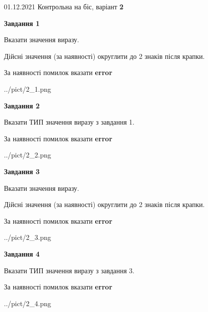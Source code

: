 \documentclass[11pt, ukrainian]{article}
\begin{document}
{01.12.2021 Контрольна на біс, варіант  \No \textbf { 2 }\par}
{
\begin {large}
{\begin {center}\textbf{Завдання 1}\end {center}}\par
Вказати значення виразу. \par
Дійсні значення (за наявності) округлити до 2 знаків після крапки. \par
За наявності помилок вказати \textbf{error}

\begin{center}
	{../pict/2_1.png}
\end{center}
\newpage

{\begin {center}\textbf{Завдання 2}\end {center}}\par
Вказати ТИП значення виразу з завдання 1. \par
За наявності помилок вказати \textbf{error}

\begin{center}
	{../pict/2_2.png}
\end{center}
\newpage

{\begin {center}\textbf{Завдання 3}\end {center}}\par
Вказати значення виразу. \par
Дійсні значення (за наявності) округлити до 2 знаків після крапки. \par
За наявності помилок вказати \textbf{error}

\begin{center}
	{../pict/2_3.png}
\end{center}
\newpage

{\begin {center}\textbf{Завдання 4}\end {center}}\par
Вказати ТИП значення виразу з завдання 3. \par
За наявності помилок вказати \textbf{error}

\begin{center}
	{../pict/2_4.png}
\end{center}
\newpage


\end{large}}
\end{document}
